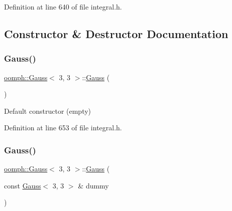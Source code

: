 Definition at line 640 of file integral.\+h.



\subsection{Constructor \& Destructor Documentation}
\mbox{\label{classoomph_1_1Gauss_3_013_00_013_01_4_a877580abe49699dec12ab3710fc0011f}} 
\subsubsection{\texorpdfstring{Gauss()}{Gauss()}\hspace{0.1cm}{\footnotesize\ttfamily [1/2]}}
{\footnotesize\ttfamily \hyperlink{classoomph_1_1Gauss}{oomph\+::\+Gauss}$<$ 3, 3 $>$\+::\hyperlink{classoomph_1_1Gauss}{Gauss} (\begin{DoxyParamCaption}{ }\end{DoxyParamCaption})\hspace{0.3cm}{\ttfamily [inline]}}



Default constructor (empty) 



Definition at line 653 of file integral.\+h.

\mbox{\label{classoomph_1_1Gauss_3_013_00_013_01_4_a25eed2726639ebfd6d68061531794c84}} 
\subsubsection{\texorpdfstring{Gauss()}{Gauss()}\hspace{0.1cm}{\footnotesize\ttfamily [2/2]}}
{\footnotesize\ttfamily \hyperlink{classoomph_1_1Gauss}{oomph\+::\+Gauss}$<$ 3, 3 $>$\+::\hyperlink{classoomph_1_1Gauss}{Gauss} (\begin{DoxyParamCaption}\item[{const \hyperlink{classoomph_1_1Gauss}{Gauss}$<$ 3, 3 $>$ \&}]{dummy }\end{DoxyParamCaption})\hspace{0.3cm}{\ttfamily [inline]}}



